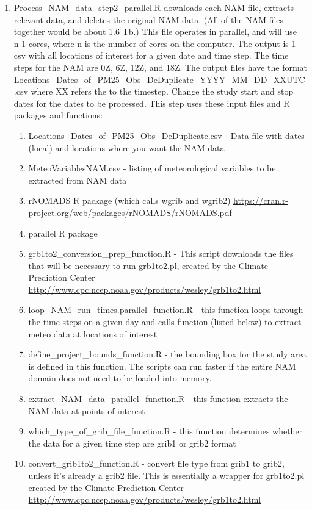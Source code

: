\begin{enumerate}
\item Process\_NAM\_data\_step2\_parallel.R downloads each NAM file, extracts relevant data, and deletes the original NAM data. (All of the NAM files together would be about 1.6 Tb.) This file operates in parallel, and will use n-1 cores, where n is the number of cores on the computer. The output is 1 csv with all locations of interest for a given date and time step. The time steps for the NAM are 0Z, 6Z, 12Z, and 18Z. The output files have the format Locations\_Dates\_of\_PM25\_Obs\_DeDuplicate\_YYYY\_MM\_DD\_XXUTC.csv where XX refers the to the timestep. Change the study start and stop dates for the dates to be processed. This step uses these input files and R packages and functions:
	\begin{enumerate}
	\item Locations\_Dates\_of\_PM25\_Obs\_DeDuplicate.csv - Data file with dates (local) and locations where you want the NAM data
	\item MeteoVariablesNAM.csv - listing of meteorological variables to be extracted from NAM data
	\item rNOMADS R package (which calls wgrib and wgrib2) \url{https://cran.r-project.org/web/packages/rNOMADS/rNOMADS.pdf}
	\item parallel R package
	\item grb1to2\_conversion\_prep\_function.R - This script downloads the files that will be necessary to run grb1to2.pl, created by the Climate Prediction Center \url{http://www.cpc.ncep.noaa.gov/products/wesley/grb1to2.html}
	\item loop\_NAM\_run\_times.parallel\_function.R - this function loops through the time steps on a given day and calls function (listed below) to extract meteo data at locations of interest
	\item define\_project\_bounds\_function.R - the bounding box for the study area is defined in this function. The scripts can run faster if the entire NAM domain does not need to be loaded into memory.
	\item extract\_NAM\_data\_parallel\_function.R - this function extracts the NAM data at points of interest
	\item which\_type\_of\_grib\_file\_function.R - this function determines whether the data for a given time step are grib1 or grib2 format
	\item convert\_grib1to2\_function.R - convert file type from grib1 to grib2, unless it's already a grib2 file. This is essentially a wrapper for grb1to2.pl created by the Climate Prediction Center \url{http://www.cpc.ncep.noaa.gov/products/wesley/grb1to2.html}
	\end{enumerate}


\end{enumerate}
